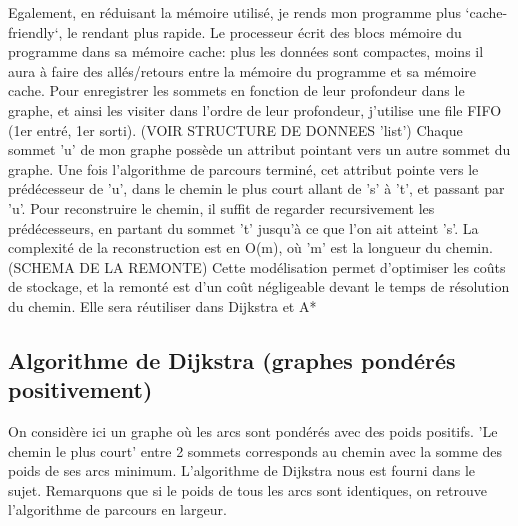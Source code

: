 \documentclass[a4paper,10pt]{article}
\begin{document}
    Egalement, en réduisant la mémoire utilisé, je rends mon programme plus `cache-friendly`, le rendant plus rapide.
    Le processeur écrit des blocs mémoire du programme dans sa mémoire cache: plus les données sont compactes,
    moins il aura à faire des allés/retours entre la mémoire du programme et sa mémoire cache.\newline\newline
    Pour enregistrer les sommets en fonction de leur profondeur dans le graphe, et ainsi les visiter dans l'ordre de leur profondeur,
    j'utilise une file FIFO (1er entré, 1er sorti).\newline
    (VOIR STRUCTURE DE DONNEES 'list')\newline\newline
    Chaque sommet 'u' de mon graphe possède un attribut pointant vers un autre sommet du graphe.
    Une fois l'algorithme de parcours terminé, cet attribut pointe vers le prédécesseur de 'u',
    dans le chemin le plus court allant de 's' à 't', et passant par 'u'.
    Pour reconstruire le chemin, il suffit de regarder recursivement les prédécesseurs, en partant du sommet 't' jusqu'à ce que l'on ait atteint 's'.
    La complexité de la reconstruction est en O(m), où 'm' est la longueur du chemin.\newline\newline
    (SCHEMA DE LA REMONTE)\newline\newline
    Cette modélisation permet d'optimiser les coûts de stockage, et la remonté est d'un coût négligeable devant le temps
    de résolution du chemin. Elle sera réutiliser dans Dijkstra et A*
    
  \subsection{Algorithme de Dijkstra (graphes pondérés positivement)}
    On considère ici un graphe où les arcs sont pondérés avec des poids positifs.\newline
    'Le chemin le plus court' entre 2 sommets corresponds au chemin avec la somme des poids de ses arcs minimum.\newline
     L'algorithme de Dijkstra nous est fourni dans le sujet. Remarquons que si le poids de tous les arcs sont identiques,
     on retrouve l'algorithme de parcours en largeur.
\end{document}
